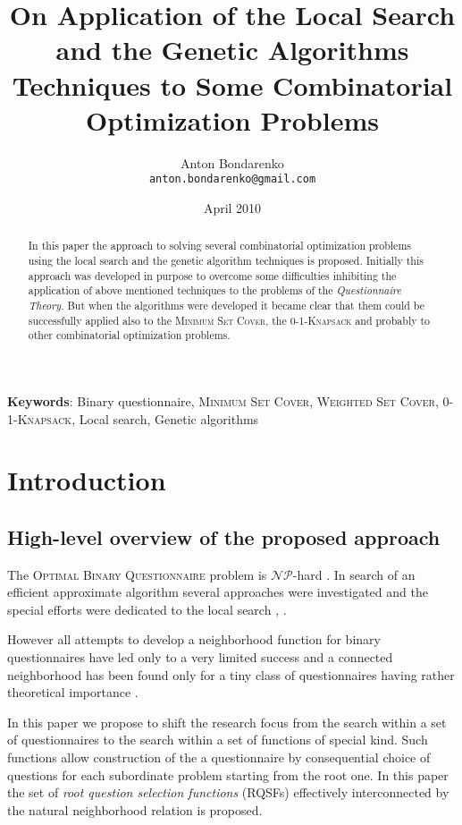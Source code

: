 \documentclass[11pt]{article}
\title{On Application of the Local Search and the Genetic Algorithms Techniques to Some Combinatorial Optimization Problems}
\author{Anton Bondarenko \\
\texttt{anton.bondarenko@gmail.com}}
\date{April 2010}
\begin{document}
\maketitle

%
%
%
%
%
%
%
\begin{abstract}
In this paper the approach to solving several combinatorial optimization problems using the local search and the genetic algorithm techniques is proposed. Initially this approach was developed in purpose to overcome some difficulties inhibiting the application of above mentioned techniques to the problems of the \emph{Questionnaire Theory}. But when the algorithms were developed it became clear that them could be successfully applied also to the \textsc{Minimum Set Cover}, the \textsc{0-1-Knapsack} and probably to other combinatorial optimization problems.
\end{abstract}

{\bf Keywords}:
Binary questionnaire,
\textsc{Minimum Set Cover},
\textsc{Weighted Set Cover},
\textsc{0-1-Knapsack},
Local search,
Genetic algorithms

%
%
%
%
%
%
%
\section{Introduction}

%
%
%
\subsection{High-level overview of the proposed approach}
The \textsc{Optimal Binary Questionnaire} problem is $\mathcal{NP}$-hard \cite{ArCh:mftd}. In search of an efficient approximate algorithm several approaches were investigated and the special efforts were dedicated to the local search \cite{ArBo:tpem}, \cite{ArBo:tpait}.  

However all attempts to develop a neighborhood function for binary questionnaires have led only to a very limited success and a connected neighborhood has been found only for a tiny class of questionnaires having rather theoretical importance \cite{Bo:tpp}.

In this paper we propose to shift the research focus from the search within a set of questionnaires to the search within a set of functions of special kind. Such functions allow construction of the a questionnaire by consequential choice of questions for each subordinate problem starting from the root one. In this paper the set of \emph{root question selection functions} (RQSFs) effectively interconnected by the natural neighborhood relation is proposed.
\end{document}
